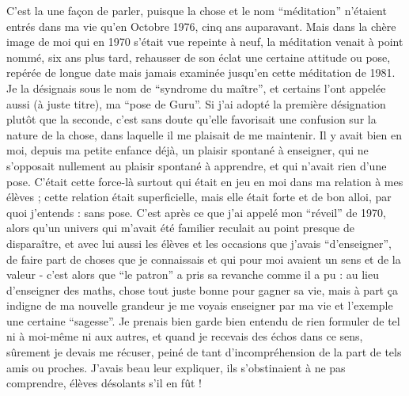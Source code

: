 C'est la une façon de parler, puisque la chose et le nom ``méditation'' n'étaient entrés dans ma vie qu'en Octobre 1976, cinq ans auparavant. Mais dans la chère image de moi qui en 1970 s'était vue repeinte à neuf, la méditation venait à point nommé, six ans plus tard, rehausser de son éclat une certaine attitude ou pose, repérée de longue date mais jamais examinée jusqu'en cette méditation de 1981. Je la désignais sous le nom de ``syndrome du maître'', et certains l'ont appelée aussi (à juste titre), ma ``pose de Guru''. Si j'ai adopté la première désignation plutôt que la seconde, c'est sans doute qu'elle favorisait une confusion sur la nature de la chose, dans laquelle il me plaisait de me maintenir. Il y avait bien en moi, depuis ma petite enfance déjà, un plaisir spontané à enseigner, qui ne s'opposait nullement au plaisir spontané à apprendre, et qui n'avait rien d'une pose. C'était cette force-là surtout qui était en jeu en moi dans ma relation à mes élèves ; cette relation était superficielle, mais elle était forte et de bon alloi, par quoi j'entends : sans pose. C'est après ce que j'ai appelé mon ``réveil'' de 1970, alors qu'un univers qui m'avait été familier reculait au point presque de disparaître, et avec lui aussi les élèves et les occasions que j'avais ``d'enseigner'', de faire part de choses que je connaissais et qui pour moi avaient un sens et de la valeur - c'est alors que ``le patron'' a pris sa revanche comme il a pu : au lieu d'enseigner des maths, chose tout juste bonne pour gagner sa vie, mais à part ça indigne de ma nouvelle grandeur je me voyais enseigner par ma vie et l'exemple une certaine ``sagesse''. Je prenais bien garde bien entendu de rien formuler de tel ni à moi-même ni aux autres, et quand je recevais des échos dans ce sens, sûrement je devais me récuser, peiné de tant d'incompréhension de la part de tels amis ou proches. J'avais beau leur expliquer, ils s'obstinaient à ne pas comprendre, élèves désolants s'il en fût !

